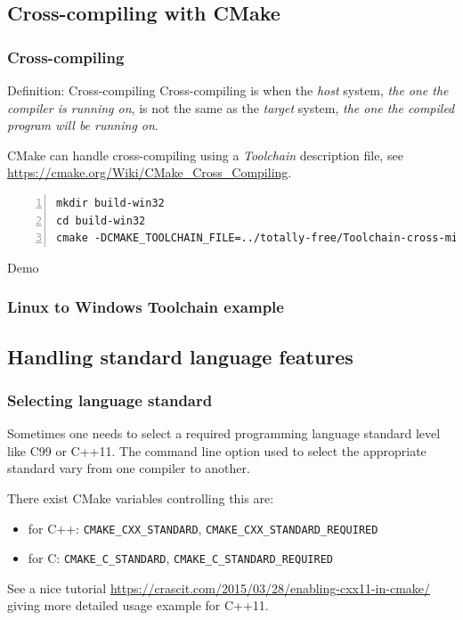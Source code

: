 \documentclass[compress,slidestop,table,usepdftitle=false
              ]
               {beamer}
\begin{document}
\subsection{Cross-compiling with CMake}
\begin{frame}[fragile]
\frametitle{Cross-compiling}
\begin{block}{Definition: Cross-compiling}
Cross-compiling is when the \emph{host} system,
\textsl{the one the compiler is running on},
is not the same as the \emph{target} system,
\textsl{the one the compiled program will be running on}.
\end{block}
CMake can handle cross-compiling using a \emph{Toolchain} description file,
see \url{https://cmake.org/Wiki/CMake_Cross_Compiling}.
\begin{Verbatim}[fontsize=\tiny,numbers=left]
mkdir build-win32
cd build-win32
cmake -DCMAKE_TOOLCHAIN_FILE=../totally-free/Toolchain-cross-mingw32-linux.cmake ../totally-free/
\end{Verbatim}
\begin{center}
{\Large
\alert{Demo}
}
\end{center}

\end{frame}

\begin{frame}[fragile]
  \frametitle{Linux to Windows Toolchain example}
  
\end{frame}

\subsection{Handling standard language features}
\begin{frame}[fragile]
\frametitle{Selecting language standard}

Sometimes one needs to select a required programming language standard level like C99 or C++11.
The command line option used to select the appropriate standard vary from one compiler to another.

There exist CMake variables controlling this are:
\begin{itemize}
\item for C++: \lstinline!CMAKE_CXX_STANDARD!, \lstinline!CMAKE_CXX_STANDARD_REQUIRED!
\item for C: \lstinline!CMAKE_C_STANDARD!, \lstinline!CMAKE_C_STANDARD_REQUIRED!
\end{itemize}

See a nice tutorial
{\small \url{https://crascit.com/2015/03/28/enabling-cxx11-in-cmake/}}
giving more detailed usage example for C++11.
\end{frame}
\end{document}
